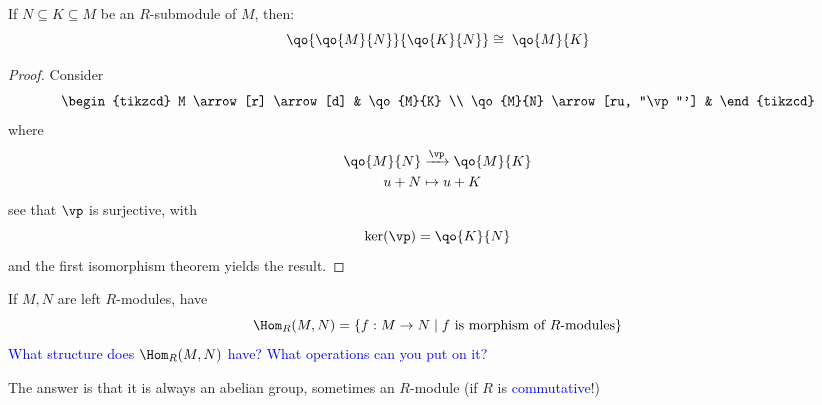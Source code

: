 \begin{theorem}
	If \( N \subseteq K \subseteq M \) be an \( R \)-submodule of \( M \), then:
	\[
		\qo{\qo{M}{N}}{\qo{K}{N}} \cong \; \qo{M}{K}
	\]
\end{theorem}

\begin{proof}
	Consider
	\[
		\begin{tikzcd}
			M \arrow[r] \arrow[d] & \qo{M}{K} \\
			\qo{M}{N} \arrow[ru, "\vp"'] &
		\end{tikzcd}
	\]
	where
	\[
		\begin{aligned}
			\qo{M}{N} & \xrightarrow{\vp} \qo{M}{K} \\
			u + N     & \mapsto u + K
		\end{aligned}
	\]
	see that \( \vp \) is surjective, with
	\[
		\ker(\vp) = \qo{K}{N}
	\]
	and the first isomorphism theorem yields the result.
\end{proof}

\begin{exercise}
	If \( M,N \) are left \( R \)-modules, have
	\[
		\Hom_{R} (M, N) = \{f : M \to N \; | \; f \text{ is morphism of } R \text{-modules}\}
	\]
	\textcolor{blue}{What structure does \( \Hom_{R}(M,N) \) have? What operations can you put on it?}
\end{exercise}
The answer is that it is always an abelian group, sometimes an \( R \)-module (if \( R \) is
\textcolor{blue}{commutative}!)

